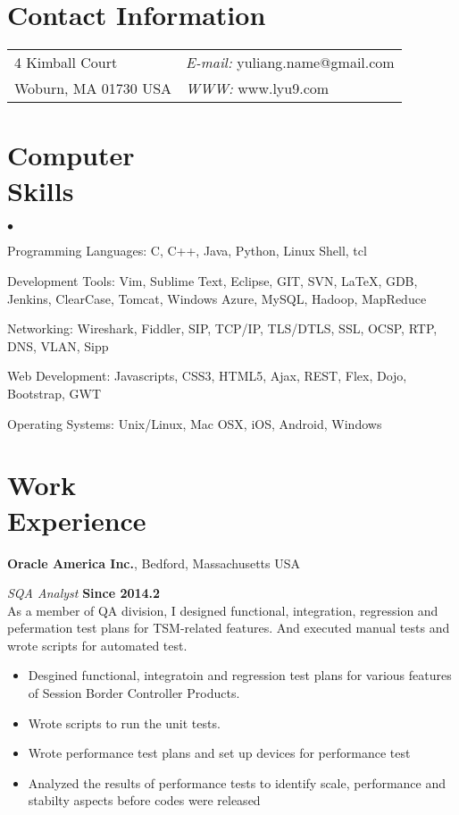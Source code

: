 \documentclass[margin,line]{res}
\newenvironment{list2}{
  \begin{list}{$\bullet$}{%
      \setlength{\itemsep}{0in}
      \setlength{\parsep}{0in} \setlength{\parskip}{0in}
      \setlength{\topsep}{0in} \setlength{\partopsep}{0in} 
      \setlength{\leftmargin}{0.2in}}}{\end{list}}
\begin{document}

\begin{resume}
\section{\sc Contact Information}
\vspace{.05in}
\begin{tabular}{@{}p{2in}p{4in}}  
4 Kimball Court & {\it E-mail:}  yuliang.name@gmail.com \\       
Woburn, MA 01730 USA  & {\it WWW:} www.lyu9.com \\     
\end{tabular}

\section{\sc Computer\\Skills} 
\begin{list2}
\item Programming Languages: C, C++, Java, Python, Linux Shell, tcl
\item Development Tools: Vim, Sublime Text, Eclipse, GIT, SVN, \LaTeX, 
                         GDB, Jenkins, ClearCase, Tomcat, Windows Azure, 
                         MySQL, Hadoop, MapReduce
\item Networking: Wireshark, Fiddler, SIP, TCP/IP, TLS/DTLS, 
                  SSL, OCSP, RTP, DNS, VLAN, Sipp
\item Web Development: Javascripts, CSS3, HTML5, Ajax, 
                       REST, Flex, Dojo, Bootstrap, GWT
\item Operating Systems:  Unix/Linux, Mac OSX, iOS, Android, Windows\\
\end{list2}

\section{\sc Work\\Experience}
{\bf Oracle America Inc.}, Bedford, Massachusetts USA

\vspace{-.3cm}
{\em SQA Analyst} \hfill {\bf Since 2014.2}\\
As a member of QA division, I designed functional, integration, regression
and pefermation test plans for TSM-related features. And executed manual tests
and wrote scripts for automated test.
\begin{itemize}
\item Desgined functional, integratoin and regression test plans for various features
of Session Border Controller Products.
\item Wrote scripts to run the unit tests.
\item Wrote performance test plans and set up devices for performance test
\item Analyzed the results of performance tests to identify scale, performance and 
stabilty aspects before codes were released
\end{itemize}


\end{resume}
\end{document}
